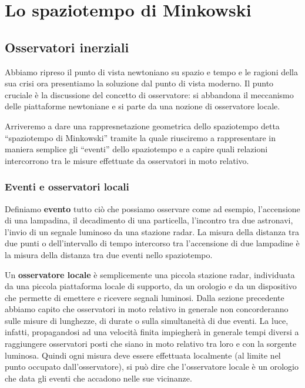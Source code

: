 \chapter{Lo spaziotempo di Minkowski}
\minitoc

\section{Osservatori inerziali}
Abbiamo ripreso il punto di vista newtoniano su spazio e tempo e le ragioni
della sua crisi ora presentiamo la soluzione dal punto di vista moderno. 
Il punto cruciale è la discussione del concetto di osservatore: si abbandona il meccanismo delle piattaforme newtoniane 
e si parte da una nozione di osservatore locale.

Arriveremo a dare una rappresnetazione geometrica dello spaziotempo detta ``spaziotempo di Minkowski'' tramite la quale riusciremo
a rappresentare in maniera semplice gli ``eventi'' dello spaziotempo e a capire quali relazioni intercorrono tra le misure effettuate
da osservatori in moto relativo.

\subsection{Eventi e osservatori locali}

Definiamo \textbf{evento} tutto ciò che possiamo osservare come ad esempio, l'accensione di una lampadina, il decadimento di una particella,
l'incontro tra due astronavi, l'invio di un segnale luminoso da una stazione radar. La misura della distanza tra due punti o dell'intervallo
di tempo intercorso tra l'accensione di due lampadine è la misura della distanza tra due eventi nello spaziotempo.

Un \textbf{osservatore locale} è semplicemente una piccola stazione radar, individuata da una piccola piattaforma locale di supporto,
da un orologio e da un dispositivo che permette di emettere e ricevere segnali luminosi. 
Dalla sezione precedente abbiamo capito che osservatori in moto relativo in generale non concorderanno sulle misure di lunghezze, di durate o 
sulla simultaneità di due eventi. La luce, infatti, propagandosi ad una velocità finita impiegherà in generale tempi diversi a raggiungere
osservatori posti che siano in moto relativo tra loro e con la sorgente luminosa.
Quindi ogni misura deve essere effettuata localmente (al limite nel punto occupato dall'osservatore), si può dire che l'osservatore
locale è un orologio che data gli eventi che accadono nelle sue vicinanze. 

